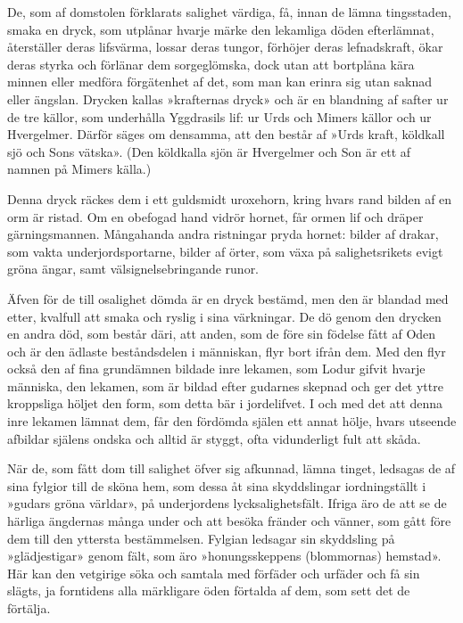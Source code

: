 De, som af domstolen förklarats salighet värdiga, få, innan de lämna
tingsstaden, smaka en dryck, som utplånar hvarje märke den lekamliga
döden efterlämnat, återställer deras lifsvärma, lossar deras tungor,
förhöjer deras lefnadskraft, ökar deras styrka och förlänar dem
sorgeglömska, dock utan att bortplåna kära minnen eller medföra
förgätenhet af det, som man kan erinra sig utan saknad eller ängslan.
Drycken kallas »krafternas dryck» och är en blandning af safter ur de
tre källor, som underhålla Yggdrasils lif: ur Urds och Mimers källor och
ur Hvergelmer. Därför säges om
densamma\protect\hypertarget{lb1625905.xhtmlux5cux23start185}{}{}\protect\hypertarget{lb1625905.xhtmlux5cux23start185-a}{}{}\protect\hypertarget{lb1625905.xhtmlux5cux23start185-b}{}{}\protect\hypertarget{lb1625905.xhtmlux5cux23start185-c}{}{}\protect\hypertarget{lb1625905.xhtmlux5cux23start185-d}{}{},
att den består af »Urds kraft, köldkall sjö och Sons vätska». (Den
köldkalla sjön är Hvergelmer och Son är ett af namnen på Mimers källa.)

Denna dryck räckes dem i ett guldsmidt uroxehorn, kring hvars rand
bilden af en orm är ristad. Om en obefogad hand vidrör hornet, får ormen
lif och dräper gärningsmannen. Mångahanda andra ristningar pryda hornet:
bilder af drakar, som vakta underjordsportarne, bilder af örter, som
växa på salighetsrikets evigt gröna ängar, samt välsignelsebringande
runor.

Äfven för de till osalighet dömda är en dryck bestämd, men den är
blandad med etter, kvalfull att smaka och ryslig i sina värkningar. De
dö genom den drycken en andra död, som består däri, att anden, som de
före sin födelse fått af Oden och är den ädlaste beståndsdelen i
människan, flyr bort ifrån dem. Med den flyr också den af fina
grundämnen bildade inre lekamen, som Lodur gifvit hvarje människa, den
lekamen, som är bildad efter gudarnes skepnad och ger det yttre
kroppsliga höljet den form, som detta bär i jordelifvet. I och med det
att denna inre lekamen lämnat dem, får den fördömda själen ett annat
hölje, hvars utseende afbildar själens ondska och alltid är styggt, ofta
vidunderligt fult att skåda.

När de, som fått dom till salighet öfver sig afkunnad, lämna tinget,
ledsagas de af sina fylgior till de sköna hem, som dessa åt sina
skyddslingar iordningställt i »gudars gröna världar», på underjordens
lycksalighetsfält. Ifriga äro de att se de härliga ängdernas många under
och att besöka fränder och vänner, som gått före dem till den yttersta
bestämmelsen. Fylgian ledsagar sin skyddsling på »glädjestigar» genom
fält, som äro »honungsskeppens (blommornas) hemstad». Här kan den
vetgirige söka och samtala med förfäder och urfäder och få sin slägts,
ja forntidens alla märkligare öden förtalda af dem, som sett det de
förtälja.

